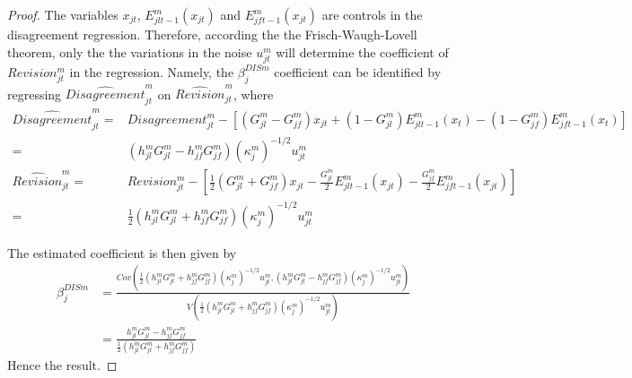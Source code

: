 \begin{proof}
The variables $x_{jt}$, $E_{jlt-1}^m(x_{jt})$ and $E_{jft-1}^m(x_{jt})$ are controls in the disagreement regression. Therefore, according the the Frisch-Waugh-Lovell theorem, only the the variations in the noise $u_{jt}^m$ will determine the coefficient of $Revision_{jt}^m$ in the regression. Namely, the $\beta_j^{DISm}$ coefficient can be identified by regressing $\widehat{Disagreement}_{jt}^m$ on $\widehat{Revision}_{jt}^m$, where
$$\begin{array}{rl}
\widehat{Disagreement}_{jt}^m=&Disagreement_{jt}^m-\left[(G_{jl}^m-G_{jf}^m)x_{jt}+(1-G_{jl}^m)E_{jlt-1}^m(x_{t})-(1-G_{jf}^m)E_{jft-1}^m(x_{t})\right]\\
						=&(h_{jl}^mG_{jl}^m-h_{jf}^mG_{jf}^m)(\kappa_j^m)^{-1/2}u_{jt}^m\\
\widehat{Revision}_{jt}^m=&Revision_{jt}^m-\left[\frac{1}{2}(G_{jl}^m+G_{jf}^m)x_{jt}-\frac{G_{jl}^m}{2}E_{jlt-1}^m(x_{jt})-\frac{G_{jf}^m}{2}E_{jft-1}^m(x_{jt})\right]\\
						=&\frac{1}{2}(h_{jl}^mG_{jl}^m+h_{jf}^mG_{jf}^m)(\kappa_j^m)^{-1/2}u_{jt}^m
\end{array}$$		

The estimated coefficient is then given by
$$\begin{array}{ll}\beta^{DISm}_{j}&=\frac{Cov\left(\frac{1}{2}(h_{jl}^mG_{jl}^m+h_{jf}^mG_{jf}^m)(\kappa_j^m)^{-1/2}u_{jt}^m,(h_{jl}^mG_{jl}^m-h_{jf}^mG_{jf}^m)(\kappa_j^m)^{-1/2}u_{jt}^m\right)}{V\left(\frac{1}{2}(h_{jl}^mG_{jl}^m+h_{jf}^mG_{jf}^m)(\kappa_j^m)^{-1/2}u_{jt}^m\right)}\\
																	&=\frac{h_{jl}^mG_{jl}^m-h_{jf}^mG_{jf}^m}{\frac{1}{2}(h_{jl}^mG_{jl}^m+h_{jf}^mG_{jf}^m)}
																	\end{array}$$
Hence the result.

\end{proof}

